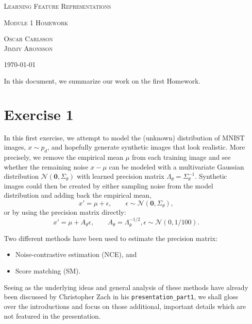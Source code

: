 \documentclass[a4paper]{article}
\theoremstyle{definition}
\theoremstyle{plain}
\begin{document}
{\center\Large\scshape Learning Feature Representations\par}
{\center\large\scshape Module 1 Homework\par}
\vspace{2mm}
{\center\scshape Oscar Carlsson\\Jimmy Aronsson\par}
\vspace{1mm}
{\center\small\scshape \today\par}
\vspace{7mm}

In this document, we summarize our work on the first Homework.

\section*{\center Exercise 1}

In this first exercise, we attempt to model the (unknown) distribution of MNIST images, $x \sim p_d$, and hopefully generate synthetic images that look realistic. More precisely, we remove the empirical mean $\mu$ from each training image and see whether the remaining noise $x - \mu$ can be modeled with a multivariate Gaussian distribution $\mathcal{N}(\mathbf{0},\Sigma_\theta)$ with learned precision matrix $\Lambda_\theta = \Sigma_\theta^{-1}$. Synthetic images could then be created by either sampling noise from the model distribution and adding back the empirical mean, 
$$x' = \mu + \epsilon, \qquad \epsilon \sim \mathcal{N}(\mathbf{0},\Sigma_\theta),$$
or by using the precision matrix directly:
$$x' = \mu + A_\theta \epsilon, \qquad A_\theta = \Lambda_\theta^{-1/2}, \epsilon \sim \mathcal{N}(0,1/100).$$

Two different methods have been used to estimate the precision matrix:
\begin{itemize}
\item Noise-contrastive estimation (NCE), and
\item Score matching (SM).
\end{itemize}
Seeing as the underlying ideas and general analysis of these methods have already been discussed by Christopher Zach in his \texttt{presentation\_part1}, we shall gloss over the introductions and focus on those additional, important details which are not featured in the presentation.
\end{document}
